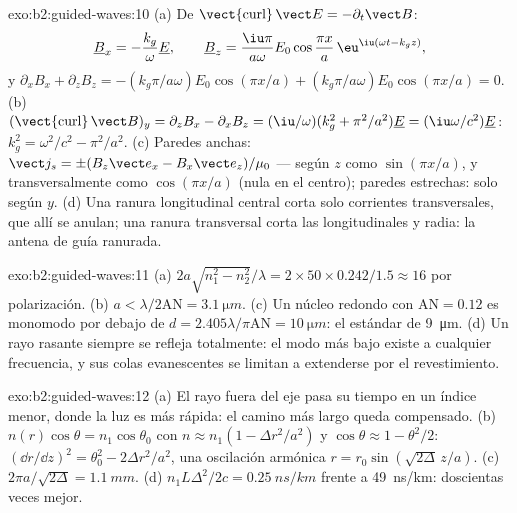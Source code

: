 \begin{solution}{exo:b2:guided-waves:10}
(a) De $\operatorname{\vect{curl}}\vect E = -\partial_t\vect B$:
\[
\underline B_x = -\frac{k_g}\omega\underline E , \qquad
\underline B_z = \frac{\iu\pi}{a\omega}E_0\cos\frac{\pi x}a\,\eu^{\iu(\omega t - k_gz)} ,
\]
y $\partial_xB_x + \partial_zB_z = -(k_g\pi/a\omega)E_0\cos(\pi x/a) + (k_g\pi/a\omega)E_0
\cos(\pi x/a) = 0$. (b) $(\operatorname{\vect{curl}}\vect B)_y = \partial_zB_x - \partial_xB_z =
(\iu/\omega)(k_g^2 + \pi^2/a^2)\underline E = (\iu\omega/c^2)\underline E$: $k_g^2 = \omega^2/c^2 - \pi^2/a^2$.
(c) Paredes anchas: $\vect j_s = \pm(B_z\vect e_x - B_x\vect e_z)/\mu_0$ --- según $z$
como $\sin(\pi x/a)$, y transversalmente como $\cos(\pi x/a)$ (nula en el centro); paredes
estrechas: solo según $y$. (d) Una ranura longitudinal central corta solo
corrientes transversales, que allí se anulan; una ranura transversal corta las
longitudinales y radia: la antena de guía ranurada.
\end{solution}

\begin{solution}{exo:b2:guided-waves:11}
(a) $2a\sqrt{n_1^2 - n_2^2}/\lambda = 2 \times 50 \times 0.242/1.5 \approx 16$ por polarización.
(b) $a < \lambda/2\mathrm{AN} = \qty{3.1}{\micro m}$. (c) Un núcleo redondo con $\mathrm{AN} =
0.12$ es monomodo por debajo de $d = 2.405\lambda/\pi\mathrm{AN} = \qty{10}{\micro m}$: el
estándar de \qty{9}{\micro m}. (d) Un rayo rasante siempre se refleja totalmente: el
modo más bajo existe a cualquier frecuencia, y sus colas evanescentes se limitan
a extenderse por el revestimiento.
\end{solution}

\begin{solution}{exo:b2:guided-waves:12}
(a) El rayo fuera del eje pasa su tiempo en un índice menor, donde la luz es
más rápida: el camino más largo queda compensado. (b) $n(r)\cos\theta = n_1\cos\theta_0$
con $n \approx n_1(1 - \Delta r^2/a^2)$ y $\cos\theta \approx 1 - \theta^2/2$: $(\dd r/\dd z)^2 =
\theta_0^2 - 2\Delta r^2/a^2$, una oscilación armónica $r = r_0\sin(\sqrt{2\Delta}\,z/a)$.
(c) $2\pi a/\sqrt{2\Delta} = \qty{1.1}{mm}$. (d) $n_1L\Delta^2/2c = \qty{0.25}{ns/km}$ frente a
\qty{49}{ns/km}: doscientas veces mejor.
\end{solution}

